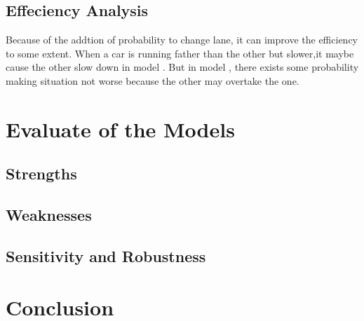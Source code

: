 \subsection{Effeciency Analysis}
Because of the addtion of probability to change lane, it can improve the efficiency to some extent. When a car is running father than the other but slower,it maybe cause the other slow down in model \uppercase\expandafter{}. But in model \uppercase\expandafter{}, there exists some probability making situation not worse because the other may overtake the one.

\section{Evaluate of the Models}
\subsection{Strengths}

\subsection{Weaknesses}

\subsection{Sensitivity and Robustness}
\section{Conclusion}




